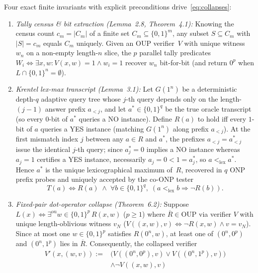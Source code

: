 \documentclass[10pt,twocolumn]{article}
\newcommand{\OUP}{\mathrm{OUP}}
\newcommand{\ONP}{\mathrm{ONP}}
\begin{document}
Four exact finite invariants with explicit preconditions drive~\eqref{eq:collapses}:
\begin{enumerate}[leftmargin=*,nosep]
  \item \emph{Tally census \& bit extraction (Lemma~2.8, Theorem~4.1):} Knowing the census count $c_m = |C_m|$ of a finite set $C_m \subseteq \{0,1\}^m$, any subset $S \subseteq C_m$ with $|S| = c_m$ equals $C_m$ uniquely. Given an $\OUP$ verifier~$V$ with unique witness $w_n$ on a non-empty length-$n$ slice, the $p$ parallel tally predicates $W_i \iff \exists x,w: V(x,w)=1 \land w_i=1$ recover $w_n$ bit-for-bit (and return $0^p$ when $L \cap \{0,1\}^n = \emptyset$).
  \item \emph{Krentel lex-max transcript (Lemma~3.1):} Let $G(1^n)$ be a deterministic depth-$q$ adaptive query tree whose $j$-th query depends only on the length-$(j-1)$ answer prefix $a_{<j}$, and let $a^\ast \in \{0,1\}^q$ be the true oracle transcript (so every $0$-bit of $a^\ast$ queries a NO instance). Define $R(a)$ to hold iff every $1$-bit of $a$ queries a YES instance (matching $G(1^n)$ along prefix $a_{<j}$). At the first mismatch index $j$ between any $a \in R$ and $a^\ast$, the prefixes $a_{<j} = a^\ast_{<j}$ issue the identical $j$-th query; since $a^\ast_j = 0$ implies a NO instance whereas $a_j = 1$ certifies a YES instance, necessarily $a_j = 0 < 1 = a^\ast_j$, so $a <_{\mathrm{lex}} a^\ast$. Hence $a^\ast$ is the unique lexicographical maximum of~$R$, recovered in $q$ $\ONP$ prefix probes and uniquely accepted by the $\mathrm{co}\text{-}\ONP$ tester
  \begin{equation}
    T(a) \iff R(a) \;\land\; \forall b \in \{0,1\}^q,\; (a <_{\mathrm{lex}} b \Rightarrow \neg R(b)).
    \label{eq:tester}
  \end{equation}
  \item \emph{Fixed-pair dot-operator collapse (Theorem~6.2):} Suppose $L(x) \iff \exists^{\mathrm{ou}} w \in \{0,1\}^p\, R(x, w)$ ($p \ge 1$) where $\overline{R} \in \OUP$ via verifier $V$ with unique length-oblivious witness $v_N$ ($V((x,w), v) \iff \neg R(x,w) \land v = v_N$). Since at most one $w \in \{0,1\}^p$ satisfies $R(0^n, w)$, at least one of $(0^n, 0^p)$ and $(0^n, 1^p)$ lies in $\overline{R}$. Consequently, the collapsed verifier
  \begin{equation}
  \begin{aligned}
    V'(x, (w, v)) :={}& \bigl(V((0^n,0^p),v) \lor V((0^n,1^p),v)\bigr) \\
    &\land \neg V((x,w),v)
  \end{aligned}

\end{equation}
\end{enumerate}
\end{document}
